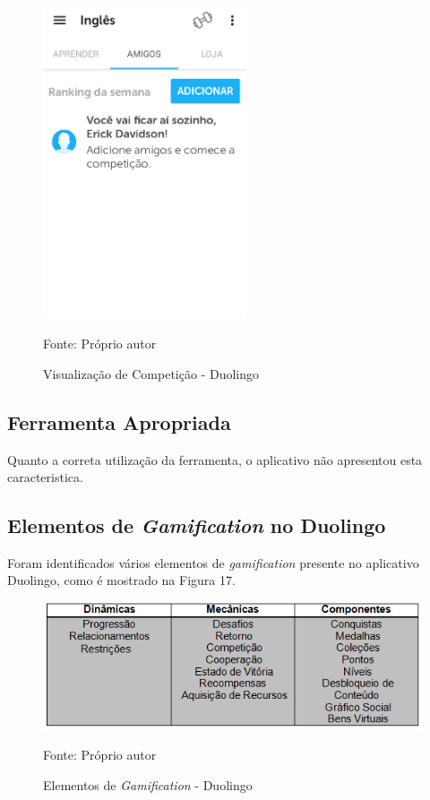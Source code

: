 \documentclass[
	12pt,				%
	openany,			%
	oneside,			%
	a4paper,			%
	english,			%
	french,				%
	spanish,			%
	brazil				%
	]{abntex2}
\begin{document}
\begin{figure}[H]
    \centering
\caption{Visualização de Competição - Duolingo}
\includegraphics[width=6cm]{figuras/competicaoduolingo.png}
\par
 Fonte: Próprio autor
\end{figure}
\subsection{Ferramenta Apropriada}
	Quanto a correta utilização da ferramenta, o aplicativo não apresentou esta caracteristica.

\subsection{Elementos de \textit{Gamification} no Duolingo}
	Foram identificados vários elementos de \textit{gamification} presente no aplicativo Duolingo, como é mostrado na Figura 17.

\begin{figure}[H]
    \centering
\caption{Elementos de \textit{Gamification} - Duolingo}
\includegraphics[width=12cm]{figuras/elementosduolingo.png}
\par
 Fonte: Próprio autor
\end{figure}
\end{document}
